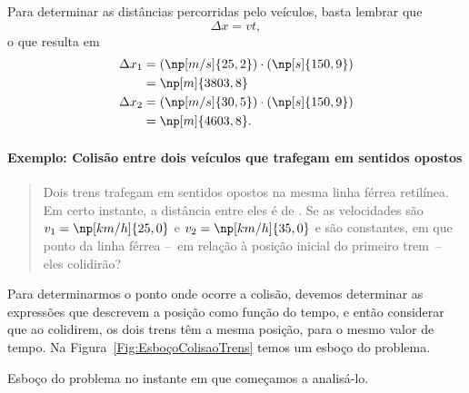Para determinar as distâncias percorridas pelo veículos, basta lembrar que
\begin{equation}
	\Delta x = v t,
\end{equation}
%
o que resulta em
\begin{align}
	\Delta x_1 &= (\np[m/s]{25,2})\cdot(\np[s]{150,9}) \\
	&= \np[m]{3803,8} \\
	\Delta x_2 &= (\np[m/s]{30,5})\cdot(\np[s]{150,9}) \\
	&= \np[m]{4603,8}.
\end{align}

\paragraph{Exemplo: Colisão entre dois veículos que trafegam em sentidos opostos}

\begin{quote}
	Dois trens trafegam em sentidos opostos na mesma linha férrea retilínea. Em certo instante, a distância entre eles é de . Se as velocidades são $v_1 = \np[km/h]{25,0}$ e $v_2 = \np[km/h]{35,0}$ e são constantes, em que ponto da linha férrea --~em relação à posição inicial do primeiro trem~-- eles colidirão?
\end{quote}

Para determinarmos o ponto onde ocorre a colisão, devemos determinar as expressões que descrevem a posição como função do tempo, e então considerar que ao colidirem, os dois trens têm a mesma posição, para o mesmo valor de tempo. Na Figura~\ref{Fig:EsboçoColisaoTrens} temos um esboço do problema.

\begin{marginfigure}
\centering
{}
\caption{Esboço do problema no instante em que começamos a analisá-lo. \label{Fig:EsboçoColisaoTrens}}
\end{marginfigure}

